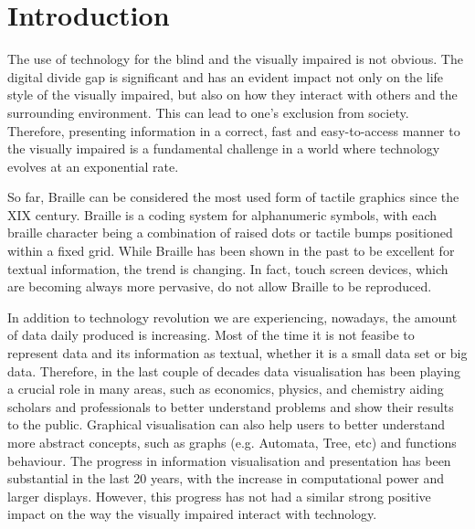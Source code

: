 \chapter{Introduction}
The use of technology for the blind and the visually impaired is not obvious. The digital divide gap is significant and has an evident impact not only on the life style of the visually impaired, but also on how they interact with others and the surrounding environment. This can lead to one's exclusion from society. Therefore, presenting information in a correct, fast and easy-to-access manner to the visually impaired is a fundamental challenge in a world where technology evolves at an exponential rate. \par

So far, Braille can be considered the most used form of tactile graphics since the XIX century\cite{andrea2009history}. Braille is a coding system for alphanumeric symbols, with each braille character being a combination of raised dots or tactile bumps positioned within a fixed grid. While Braille has been shown in the past to be excellent for textual information, the trend is changing. In fact, touch screen devices, which are becoming always more pervasive, do not allow Braille to be reproduced. \par

In addition to technology revolution we are experiencing, nowadays, the amount of data  daily produced is increasing. Most of the time it is not feasibe to represent data and its information as textual, whether it is a small data set or big data. Therefore, in the last couple of decades data visualisation has been playing a crucial role in many areas, such as economics, physics, and chemistry aiding scholars and professionals to better understand problems and show their results to the public. Graphical visualisation can also help users to better understand more abstract concepts, such as graphs (e.g. Automata, Tree, etc) and functions behaviour. 
The progress in information visualisation and presentation has been substantial in the last 20 years, with the increase in computational power and larger displays. However, this progress has not had a similar strong positive impact on the way the visually impaired interact with technology. \par 

